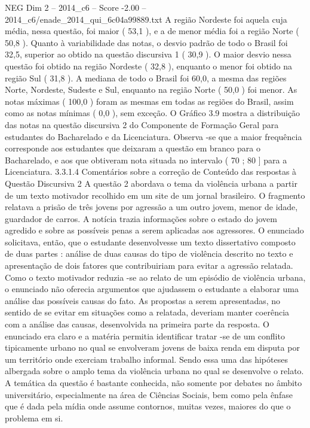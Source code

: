 \begin{textsample}{NEG Dim 2 – 2014\_c6 – Score -2.00 – 2014\_c6/enade\_2014\_qui\_6c04a99889.txt}
A região Nordeste foi aquela cuja média, nessa questão, foi maior ( 53,1 ), e a de menor média foi a região Norte ( 50,8 ).
Quanto à variabilidade das notas, o desvio padrão de todo o Brasil foi 32,5, superior ao obtido na questão discursiva 1 ( 30,9 ).
O maior desvio nessa questão foi obtido na região Nordeste ( 32,8 ), enquanto o menor foi obtido na região Sul ( 31,8 ).
A mediana de todo o Brasil foi 60,0, a mesma das regiões Norte, Nordeste, Sudeste e Sul, enquanto na região Norte ( 50,0 ) foi menor.
As notas máximas ( 100,0 ) foram as mesmas em todas as regiões do Brasil, assim como as notas mínimas ( 0,0 ), sem exceção.
O Gráfico 3.9 mostra a distribuição das notas na questão discursiva 2 do Componente de Formação Geral para estudantes do Bacharelado e da Licenciatura.
Observa -se que a maior frequência corresponde aos estudantes que deixaram a questão em branco para o Bacharelado, e aos que obtiveram nota situada no intervalo ( 70 ; 80 ] para a Licenciatura. 3.3.1.4 Comentários sobre a correção de Conteúdo das respostas à Questão Discursiva 2 A questão 2 abordava o tema da violência urbana a partir de um texto motivador recolhido em um site de um jornal brasileiro.
O fragmento relatava a prisão de três jovens por agressão a um outro jovem, menor de idade, guardador de carros.
A notícia trazia informações sobre o estado do jovem agredido e sobre as possíveis penas a serem aplicadas aos agressores.
O enunciado solicitava, então, que o estudante desenvolvesse um texto dissertativo composto de duas partes : análise de duas causas do tipo de violência descrito no texto e apresentação de dois fatores que contribuiriam para evitar a agressão relatada.
Como o texto motivador reduzia -se ao relato de um episódio de violência urbana, o enunciado não oferecia argumentos que ajudassem o estudante a elaborar uma análise das possíveis causas do fato.
As propostas a serem apresentadas, no sentido de se evitar em situações como a relatada, deveriam manter coerência com a análise das causas, desenvolvida na primeira parte da resposta.
O enunciado era claro e a matéria permitia identificar tratar -se de um conflito tipicamente urbano no qual se envolveram jovens de baixa renda em disputa por um território onde exerciam trabalho informal.
Sendo essa uma das hipóteses albergada sobre o amplo tema da violência urbana no qual se desenvolve o relato.
A temática da questão é bastante conhecida, não somente por debates no âmbito universitário, especialmente na área de Ciências Sociais, bem como pela ênfase que é dada pela mídia onde assume contornos, muitas vezes, maiores do que o problema em si.

\end{textsample}
